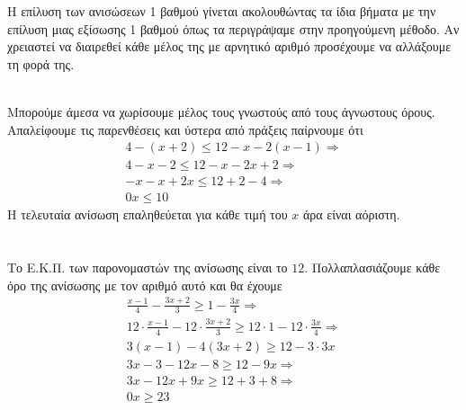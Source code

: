 \Lymena
\begin{Methodos}{9cm}
Η επίλυση των ανισώσεων 1 βαθμού γίνεται ακολουθώντας τα ίδια βήματα με την επίλυση μιας εξίσωσης 1 βαθμού όπως τα περιγράψαμε στην προηγούμενη μέθοδο. Αν χρειαστεί να διαιρεθεί κάθε μέλος της με αρνητικό αριθμό προσέχουμε να αλλάξουμε τη φορά της.
\end{Methodos}
\lysh\\
Μπορούμε άμεσα να χωρίσουμε μέλος  τους γνωστούς από τους άγνωστους όρους.\\
\lysh
Απαλείφουμε τις παρενθέσεις και ύστερα από πράξεις παίρνουμε ότι
\begin{gather*}
4-(x+2)\leq 12-x-2(x-1)\Rightarrow\\
4-x-2\leq 12-x-2x+2\Rightarrow\\
-x-x+2x\leq 12+2-4\Rightarrow\\
0x\leq 10
\end{gather*}
Η τελευταία ανίσωση επαληθεύεται για κάθε τιμή του $ x $ άρα είναι αόριστη.\\\\
\lysh\\
Το Ε.Κ.Π. των παρονομαστών της ανίσωσης είναι το $ 12 $. Πολλαπλασιάζουμε κάθε όρο της ανίσωσης με τον αριθμό αυτό και θα έχουμε
\begin{gather*}
\frac{x-1}{4}-\frac{3x+2}{3}\geq 1-\frac{3x}{4}\Rightarrow\\
12\cdot\frac{x-1}{4}-12\cdot\frac{3x+2}{3}\geq 12\cdot 1-12\cdot\frac{3x}{4}\Rightarrow\\
3(x-1)-4(3x+2)\geq 12-3\cdot 3x\\
3x-3-12x-8\geq 12-9x\Rightarrow\\
3x-12x+9x\geq 12+3+8\Rightarrow\\
0x\geq 23
\end{gather*}
